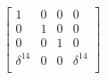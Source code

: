 $$\left[
\begin{array}{*{4}{r}}
1 & 0 & 0 & 0\\
0 & 1 & 0 & 0\\
0 & 0 & 1 & 0\\
\delta^{14} & 0 & 0 & \delta^{14}\\
\end{array}
\right]
$$
